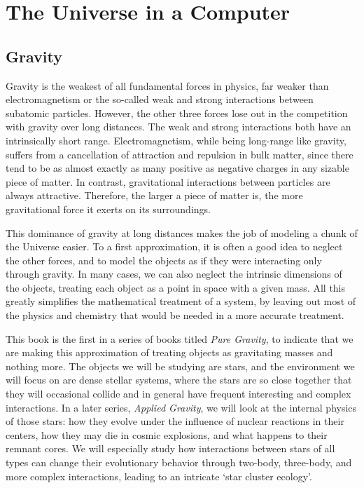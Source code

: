 \chapter{The Universe in a Computer}

\section{Gravity}

Gravity is the weakest of all fundamental forces in physics, far
weaker than electromagnetism or the so-called weak and strong
interactions between subatomic particles.  However, the other three
forces lose out in the competition with gravity over long distances.
The weak and strong interactions both have an intrinsically short
range.  Electromagnetism, while being long-range like gravity, suffers
from a cancellation of attraction and repulsion in bulk matter, since
there tend to be as almost exactly as many positive as negative
charges in any sizable piece of matter.  In contrast, gravitational
interactions between particles are always attractive.  Therefore, the
larger a piece of matter is, the more gravitational force it exerts on
its surroundings.

This dominance of gravity at long distances makes the job of
modeling a chunk of the Universe easier.  To a first approximation, it
is often a good idea to neglect the other forces, and to model the
objects as if they were interacting only through gravity.  In many
cases, we can also neglect the intrinsic dimensions of the objects,
treating each object as a point in space with a given mass.  All this
greatly simplifies the mathematical treatment of a system, by leaving
out most of the physics and chemistry that would be needed in a more
accurate treatment.

This book is the first in a series of books titled {\it Pure Gravity}, to
indicate that we are making this approximation of treating objects as
gravitating masses and nothing more.  The objects we will be studying
are stars, and the environment we will focus on are dense stellar
systems, where the stars are so close together that they will
occasional collide and in general have frequent interesting and
complex interactions.  In a later series, {\it Applied Gravity}, we will
look at the internal physics of those stars: how they evolve under the
influence of nuclear reactions in their centers, how they may die in
cosmic explosions, and what happens to their remnant cores.  We will
especially study how interactions between stars of all types can change
their evolutionary behavior through two-body, three-body, and more
complex interactions, leading to an intricate `star cluster ecology'.

